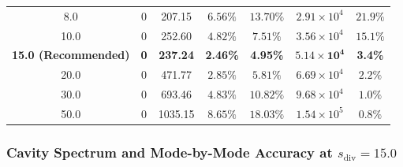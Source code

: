 \documentclass[VANCOUVER,Times1COL]{WileyNJD-v5}
\begin{document}
\begin{table}[!t]
{\begin{tabular}{ccccccc}
            8.0                             & 0                     & 207.15                                      & $6.56\%$                                             & $13.70\%$                                           & $2.91 \times 10^4$                                      & $21.9\%$                                                   \\
            10.0                            & 0                     & 252.60                                      & $4.82\%$                                             & $7.51\%$                                            & $3.56 \times 10^4$                                      & $15.1\%$                                                   \\
            \textbf{15.0 (Recommended)}     & \textbf{0}            & \textbf{237.24}                             & \textbf{2.46\%}                                      & \textbf{4.95\%}                                     & $\mathbf{5.14 \times 10^4}$                             & \textbf{3.4\%}                                             \\
            20.0                            & 0                     & 471.77                                      & $2.85\%$                                             & $5.81\%$                                            & $6.69 \times 10^4$                                      & $2.2\%$                                                    \\
            30.0                            & 0                     & 693.46                                      & $4.83\%$                                             & $10.82\%$                                           & $9.68 \times 10^4$                                      & $1.0\%$                                                    \\
            50.0                            & 0                     & 1035.15                                     & $8.65\%$                                             & $18.03\%$                                           & $1.54 \times 10^5$                                      & $0.8\%$                                                    \\
            \bottomrule
        \end{tabular}
    }
\end{table}

\subsubsection{Cavity Spectrum and Mode-by-Mode Accuracy at $s_{\mathrm{div}} = 15.0$}
\label{subsubsec:cavity_modes_15}
\end{document}
